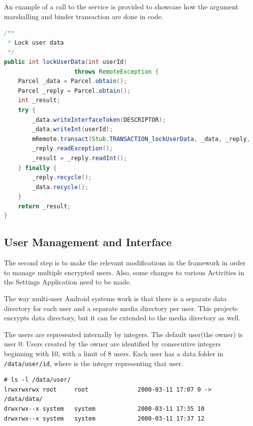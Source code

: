 An example of a call to the service is provided to showcase how the argument marshalling and binder transaction are done in code.

\begin{minipage}{\linewidth}
\begin{lstlisting}[language=Java, caption=lockUserData service method, label=lst:lock-user-data-multi-user]
/**
 * Lock user data
 */
public int lockUserData(int userId)
					throws RemoteException {
	Parcel _data = Parcel.obtain();
	Parcel _reply = Parcel.obtain();
	int _result;
	try {
		_data.writeInterfaceToken(DESCRIPTOR);
		_data.writeInt(userId);
		mRemote.transact(Stub.TRANSACTION_lockUserData, _data, _reply, 0);
		_reply.readException();
		_result = _reply.readInt();
	} finally {
		_reply.recycle();
		_data.recycle();
	}
	return _result;
}
\end{lstlisting}
\end{minipage}

\subsection{User Management and Interface}
\label{sub-sec:user-mngmt-inter-multi-user}

The second step is to make the relevant modifications in the framework in order to manage multiple encrypted users. Also, some changes to various Activities in the Settings Application need to be made.

The way multi-user Android systems work is that there is a separate data directory for each user and a separate media directory per user. This projects encrypts data directory, but it can be extended to the media directory as well.

The users are represented internally by integers. The default user(the owner) is user 0. Users created by the owner are identified by consecutive integers beginning with 10, with a limit of 8 users. Each user has a data folder in \texttt{/data/user/id}, where  is the integer representing that user.

\begin{minipage}{\linewidth}
\begin{lstlisting}[numbers=none, caption=User Data Directories, label=lst:usr-data-multi-user]
# ls -l /data/user/                                             
lrwxrwxrwx root     root              2000-03-11 17:07 0 -> /data/data/
drwxrwx--x system   system            2000-03-11 17:35 10
drwxrwx--x system   system            2000-03-11 17:37 12
\end{lstlisting}
\end{minipage}

